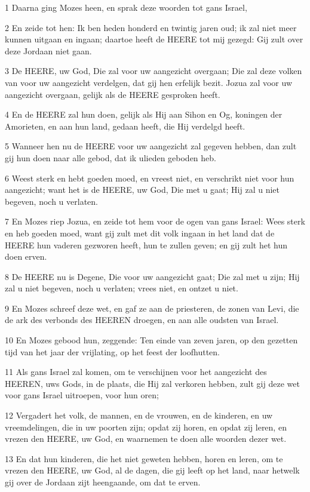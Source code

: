 \par 1 Daarna ging Mozes heen, en sprak deze woorden tot gans Israel,
\par 2 En zeide tot hen: Ik ben heden honderd en twintig jaren oud; ik zal niet meer kunnen uitgaan en ingaan; daartoe heeft de HEERE tot mij gezegd: Gij zult over deze Jordaan niet gaan.
\par 3 De HEERE, uw God, Die zal voor uw aangezicht overgaan; Die zal deze volken van voor uw aangezicht verdelgen, dat gij hen erfelijk bezit. Jozua zal voor uw aangezicht overgaan, gelijk als de HEERE gesproken heeft.
\par 4 En de HEERE zal hun doen, gelijk als Hij aan Sihon en Og, koningen der Amorieten, en aan hun land, gedaan heeft, die Hij verdelgd heeft.
\par 5 Wanneer hen nu de HEERE voor uw aangezicht zal gegeven hebben, dan zult gij hun doen naar alle gebod, dat ik ulieden geboden heb.
\par 6 Weest sterk en hebt goeden moed, en vreest niet, en verschrikt niet voor hun aangezicht; want het is de HEERE, uw God, Die met u gaat; Hij zal u niet begeven, noch u verlaten.
\par 7 En Mozes riep Jozua, en zeide tot hem voor de ogen van gans Israel: Wees sterk en heb goeden moed, want gij zult met dit volk ingaan in het land dat de HEERE hun vaderen gezworen heeft, hun te zullen geven; en gij zult het hun doen erven.
\par 8 De HEERE nu is Degene, Die voor uw aangezicht gaat; Die zal met u zijn; Hij zal u niet begeven, noch u verlaten; vrees niet, en ontzet u niet.
\par 9 En Mozes schreef deze wet, en gaf ze aan de priesteren, de zonen van Levi, die de ark des verbonds des HEEREN droegen, en aan alle oudsten van Israel.
\par 10 En Mozes gebood hun, zeggende: Ten einde van zeven jaren, op den gezetten tijd van het jaar der vrijlating, op het feest der loofhutten.
\par 11 Als gans Israel zal komen, om te verschijnen voor het aangezicht des HEEREN, uws Gods, in de plaats, die Hij zal verkoren hebben, zult gij deze wet voor gans Israel uitroepen, voor hun oren;
\par 12 Vergadert het volk, de mannen, en de vrouwen, en de kinderen, en uw vreemdelingen, die in uw poorten zijn; opdat zij horen, en opdat zij leren, en vrezen den HEERE, uw God, en waarnemen te doen alle woorden dezer wet.
\par 13 En dat hun kinderen, die het niet geweten hebben, horen en leren, om te vrezen den HEERE, uw God, al de dagen, die gij leeft op het land, naar hetwelk gij over de Jordaan zijt heengaande, om dat te erven.
